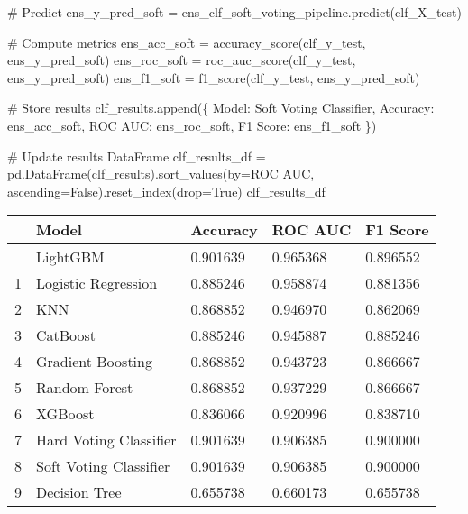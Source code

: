\documentclass[
  letterpaper,
  DIV=11,
  numbers=noendperiod]{scrreprt}
\newenvironment{Shaded}{\begin{snugshade}}{\end{snugshade}}
\newcommand{\CommentTok}[1]{\textcolor[rgb]{0.37,0.37,0.37}{#1}}
\newcommand{\NormalTok}[1]{\textcolor[rgb]{0.00,0.23,0.31}{#1}}
\newcommand{\OperatorTok}[1]{\textcolor[rgb]{0.37,0.37,0.37}{#1}}
\newcommand{\StringTok}[1]{\textcolor[rgb]{0.13,0.47,0.30}{#1}}
\newcommand{\VariableTok}[1]{\textcolor[rgb]{0.07,0.07,0.07}{#1}}
\begin{document}
\begin{Shaded}
\begin{Highlighting}[]
\CommentTok{\# Predict}
\NormalTok{ens\_y\_pred\_soft }\OperatorTok{=}\NormalTok{ ens\_clf\_soft\_voting\_pipeline.predict(clf\_X\_test)}

\CommentTok{\# Compute metrics}
\NormalTok{ens\_acc\_soft }\OperatorTok{=}\NormalTok{ accuracy\_score(clf\_y\_test, ens\_y\_pred\_soft)}
\NormalTok{ens\_roc\_soft }\OperatorTok{=}\NormalTok{ roc\_auc\_score(clf\_y\_test, ens\_y\_pred\_soft)}
\NormalTok{ens\_f1\_soft }\OperatorTok{=}\NormalTok{ f1\_score(clf\_y\_test, ens\_y\_pred\_soft)}

\CommentTok{\# Store results}
\NormalTok{clf\_results.append(\{}
    \StringTok{\textquotesingle{}Model\textquotesingle{}}\NormalTok{: }\StringTok{\textquotesingle{}Soft Voting Classifier\textquotesingle{}}\NormalTok{,}
    \StringTok{\textquotesingle{}Accuracy\textquotesingle{}}\NormalTok{: ens\_acc\_soft,}
    \StringTok{\textquotesingle{}ROC AUC\textquotesingle{}}\NormalTok{: ens\_roc\_soft,}
    \StringTok{\textquotesingle{}F1 Score\textquotesingle{}}\NormalTok{: ens\_f1\_soft}
\NormalTok{\})}

\CommentTok{\# Update results DataFrame}
\NormalTok{clf\_results\_df }\OperatorTok{=}\NormalTok{ pd.DataFrame(clf\_results).sort\_values(by}\OperatorTok{=}\StringTok{\textquotesingle{}ROC AUC\textquotesingle{}}\NormalTok{, ascending}\OperatorTok{=}\VariableTok{False}\NormalTok{).reset\_index(drop}\OperatorTok{=}\VariableTok{True}\NormalTok{)}
\NormalTok{clf\_results\_df}
\end{Highlighting}
\end{Shaded}

\begin{longtable}[]{@{}lllll@{}}
\toprule\noalign{}
& Model & Accuracy & ROC AUC & F1 Score \\
\midrule\noalign{}
\endhead
\bottomrule\noalign{}
\endlastfoot
0 & LightGBM & 0.901639 & 0.965368 & 0.896552 \\
1 & Logistic Regression & 0.885246 & 0.958874 & 0.881356 \\
2 & KNN & 0.868852 & 0.946970 & 0.862069 \\
3 & CatBoost & 0.885246 & 0.945887 & 0.885246 \\
4 & Gradient Boosting & 0.868852 & 0.943723 & 0.866667 \\
5 & Random Forest & 0.868852 & 0.937229 & 0.866667 \\
6 & XGBoost & 0.836066 & 0.920996 & 0.838710 \\
7 & Hard Voting Classifier & 0.901639 & 0.906385 & 0.900000 \\
8 & Soft Voting Classifier & 0.901639 & 0.906385 & 0.900000 \\
9 & Decision Tree & 0.655738 & 0.660173 & 0.655738 \\
\end{longtable}
\end{document}
